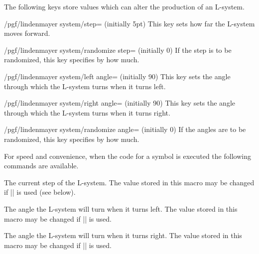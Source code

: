 \begin{command}{\pgfdeclarelindenmayersystem{}}
\begin{command}{\symbol{}}
The following keys store values which can alter the production of an
L-system. 

\begin{key}{/pgf/lindenmayer system/step= (initially 5pt)}
  This key sets how far the L-system moves forward.
\end{key}

\begin{key}{/pgf/lindenmayer system/randomize step= (initially 0)}
  If the step is to be randomized, this key specifies by how much. 
\end{key}

\begin{key}{/pgf/lindenmayer system/left angle= (initially 90)}
  This key sets the angle through which the L-system turns when it
  turns left.
\end{key}

\begin{key}{/pgf/lindenmayer system/right angle= (initially 90)}
  This key sets the angle through which the L-system turns when it
  turns right.
\end{key}

\begin{key}{/pgf/lindenmayer system/randomize angle= (initially 0)}
  If the angles are to be randomized, this key specifies by how much. 
\end{key}

For speed and convenience, when the code for a symbol is executed the 
following commands are available.

\begin{command}{\pgflsystemstep}
	The current step of the L-system. The value stored in this macro
	may be changed if |\pgflsystemrandomizestep| is used (see below). 
\end{command}

\begin{command}{\pgflsystemleftangle}
	The angle the L-system will turn when it turns left. 
	The value stored in this macro may be changed if 
	|\pgflsystemrandomizeleftangle| is used. 
\end{command}

\begin{command}{\pgflsystemrightangle}
	The angle the L-system will turn when it turns right. 
	The value stored in this macro may be changed if 
	|\pgflsystemrandomizerightangle| is used. 
\end{command}



\end{command}
\end{command}
